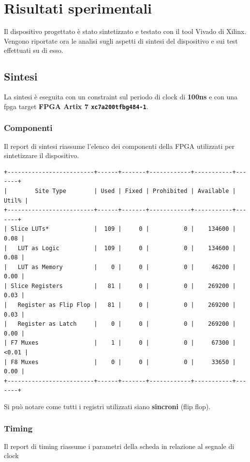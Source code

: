 \documentclass[a4paper]{report}
\begin{document}

\chapter{Risultati sperimentali}
Il dispositivo progettato è stato sintetizzato e testato con il tool Vivado di Xilinx. Vengono riportate ora le analisi sugli aspetti di sintesi del dispositivo e sui test effettuati su di esso.

\section{Sintesi}
La sintesi è eseguita con un constraint sul periodo di clock di \textbf{100ns} e con una fpga target \textbf{FPGA Artix 7 \texttt{xc7a200tfbg484-1}}.
\subsection{Componenti}
Il report di sintesi riassume l'elenco dei componenti della FPGA utilizzati per sintetizzare il dispositivo.

\begin{verbatim}
+-------------------------+------+-------+------------+-----------+-------+
|        Site Type        | Used | Fixed | Prohibited | Available | Util% |
+-------------------------+------+-------+------------+-----------+-------+
| Slice LUTs*             |  109 |     0 |          0 |    134600 |  0.08 |
|   LUT as Logic          |  109 |     0 |          0 |    134600 |  0.08 |
|   LUT as Memory         |    0 |     0 |          0 |     46200 |  0.00 |
| Slice Registers         |   81 |     0 |          0 |    269200 |  0.03 |
|   Register as Flip Flop |   81 |     0 |          0 |    269200 |  0.03 |
|   Register as Latch     |    0 |     0 |          0 |    269200 |  0.00 |
| F7 Muxes                |    1 |     0 |          0 |     67300 | <0.01 |
| F8 Muxes                |    0 |     0 |          0 |     33650 |  0.00 |
+-------------------------+------+-------+------------+-----------+-------+
\end{verbatim}

Si può notare come tutti i registri utilizzati siano    \textbf{sincroni} (flip flop).

\subsection{Timing}
Il report di timing riassume i parametri della scheda in relazione al segnale di clock
\end{document}
